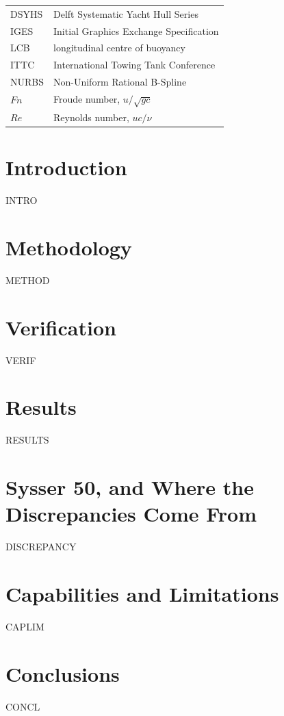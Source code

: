\documentclass[11pt]{article}
\newcommand{\Fn}{\mathit{Fn}}
\begin{document}
\vspace{3mm}
\noindent
\begin{tabular}{@{}ll@{}}
DSYHS & Delft Systematic Yacht Hull Series\\
IGES  & Initial Graphics Exchange Specification\\
LCB   & longitudinal centre of buoyancy\\
ITTC  & International Towing Tank Conference\\
NURBS & Non-Uniform Rational B-Spline\\
$\Fn$ & Froude number, $u/\sqrt{gc}$\\
$Re$  & Reynolds number, $uc/\nu$\\
\end{tabular}

\section{Introduction}
INTRO

\section{Methodology}
METHOD

\section{Verification}
VERIF

\section{Results}
RESULTS

\section{Sysser 50, and Where the Discrepancies Come From}
DISCREPANCY

\section{Capabilities and Limitations}
CAPLIM

\section{Conclusions}
CONCL
\end{document}
